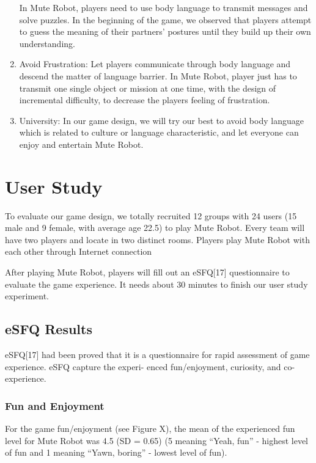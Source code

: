 \documentclass{sigchi}
\begin{document}
\begin{enumerate}
In Mute Robot, players need to use body language to transmit messages and solve puzzles. In the beginning of the game, we observed that players attempt to guess the meaning of their partners’ postures until they build up their own understanding. 
\item Avoid Frustration: 
Let players communicate through body language and descend the matter of language barrier. In Mute Robot, player just has to transmit one single object or mission at one time, with the design of incremental difficulty, to decrease the players feeling of frustration.
\item University: 
In our game design, we will try our best to avoid body language which is related to culture or language characteristic, and let everyone can enjoy and entertain Mute Robot.
\end{enumerate}


\section{User Study}
To evaluate our game design, we totally recruited 12 groups with 24 users (15 male and 9 female, with average age 22.5) to play Mute Robot. Every team will have two players and locate in two distinct rooms. Players play Mute Robot with each other through Internet connection

After playing Mute Robot, players will fill out an eSFQ[17] questionnaire to evaluate the game experience. It needs about 30 minutes to finish our user study experiment. 

\subsection{eSFQ Results}

eSFQ[17] had been proved that it is a questionnaire for rapid assessment of game experience. eSFQ capture the experi- enced fun/enjoyment, curiosity, and co-experience. 


\subsubsection{Fun and Enjoyment}
For the game fun/enjoyment (see Figure X), the mean of the experienced fun level for Mute Robot was 4.5 (SD = 0.65) (5 meaning “Yeah, fun” - highest level of fun and 1 meaning “Yawn, boring” - lowest level of fun). 
\end{document}
